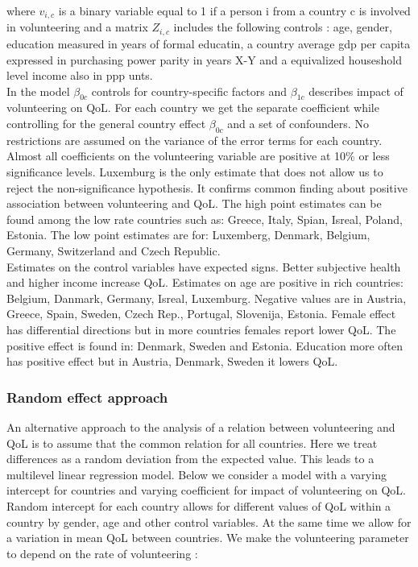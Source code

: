 \documentclass[10pt, letterpaper]{article}
\begin{document}
\begin{spacing}{1.4}
where $v_{i,c}$ is a binary variable equal to 1 if a person i from a country c is involved in  volunteering  and a matrix $Z_{i,c}$ includes the following controls : age, gender, education measured in years of formal educatin, a country average gdp per capita expressed in purchasing power parity in years X-Y and a equivalized houseshold level income also in ppp unts.  \\


In the model $\beta_{0c}$ controls for country-specific factors   and $\beta_{1c}$ describes impact of volunteering on QoL. For each country we get the separate coefficient while controlling for the general country effect $\beta_{0c}$ and a set of confounders. No restrictions are assumed on the variance of the error terms for each country. \\

Almost all coefficients on the volunteering variable are positive at 10\% or less significance levels. Luxemburg is the only estimate that does not allow us to reject the non-significance hypothesis. It confirms common finding about positive association between volunteering and QoL. The high point estimates can be found  among the low rate countries such as: Greece, Italy, Spian, Isreal, Poland, Estonia. The low point estimates are for: Luxemberg, Denmark, Belgium, Germany, Switzerland and Czech Republic. \\

Estimates on the control variables have expected signs. Better subjective health and higher income increase QoL. Estimates on age are positive in rich countries: Belgium, Danmark, Germany, Isreal, Luxemburg. Negative values are in Austria, Greece, Spain, Sweden, Czech Rep., Portugal, Slovenija, Estonia.  Female effect has differential directions but in more countries females report lower QoL. The positive effect is found in: Denmark, Sweden and Estonia. Education more often has positive effect but in Austria, Denmark, Sweden it lowers QoL. \\    





\subsubsection*{ Random effect approach}

An alternative approach to the analysis of a relation between volunteering and QoL is to assume that the common relation for all countries. Here we treat differences as a random deviation from the expected value. This leads to a multilevel linear regression model. Below we consider a model with a varying intercept for countries and varying coefficient for impact of volunteering on QoL. Random intercept for each country allows for different values of QoL within a country by gender, age and other control variables. At the same time we allow for a variation in mean QoL between countries. We make the volunteering parameter to depend on the rate of volunteering :



\end{spacing}
\end{document}
